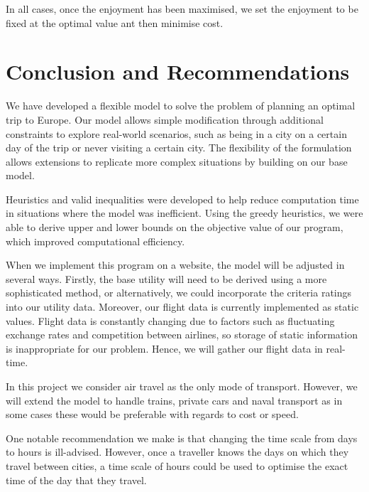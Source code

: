 \documentclass[12pt]{article}
\begin{document}
In all cases, once the enjoyment has been maximised, we set the enjoyment to be fixed at the optimal value ant then minimise cost.



\pagebreak

\section{Conclusion and Recommendations}
\label{sec:conc}


We have developed a flexible model to solve the problem of planning an optimal trip to Europe. Our model allows simple modification through additional constraints to explore real-world scenarios, such as being in a city on a certain day of the trip or never visiting a certain city. The flexibility of the formulation allows extensions to replicate more complex situations by building on our base model.

Heuristics and valid inequalities were developed to help reduce computation time in situations where the model was inefficient. Using the greedy heuristics, we were able to derive upper and lower bounds on the objective value of our program, which improved computational efficiency.

When we implement this program on a website, the model will be adjusted in several ways. Firstly, the base utility will need to be derived using a more sophisticated method, or alternatively, we could incorporate the criteria ratings into our utility data. Moreover, our flight data is currently implemented as static values. Flight data is constantly changing due to factors such as fluctuating exchange rates and competition between airlines, so storage of static information is inappropriate for our problem. Hence, we will gather our flight data in real-time.

In this project we consider air travel as the only mode of transport. However, we will extend the model to handle trains, private cars and naval transport as in some cases these would be preferable with regards to cost or speed.

One notable recommendation we make is that changing the time scale from days to hours is ill-advised. However, once a traveller knows the days on which they travel between cities, a time scale of hours could be used to optimise the exact time of the day that they travel.
\end{document}

